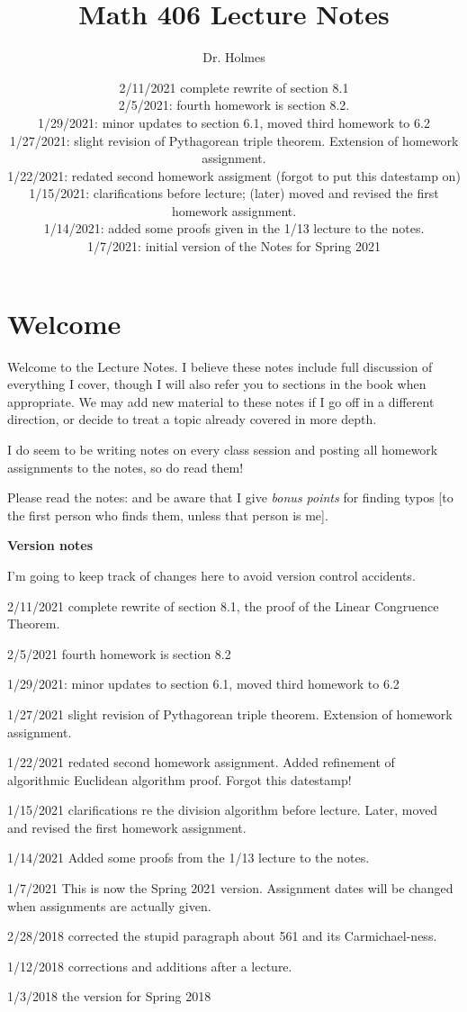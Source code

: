 \documentclass[12pt]{article}
\title{Math 406 Lecture Notes}
\author{Dr. Holmes}
\date{
2/11/2021 complete rewrite of section 8.1\\2/5/2021:  fourth homework is section 8.2.\\
1/29/2021:  minor updates to section 6.1, moved third homework to 6.2\\
1/27/2021:  slight revision of Pythagorean triple theorem.  Extension of homework assignment.\\
1/22/2021:  redated second homework assigment (forgot to put this datestamp on)\\
1/15/2021:  clarifications before lecture;  (later) moved and revised the first homework assignment.\\
1/14/2021:  added some proofs given in the 1/13 lecture to the notes.\\
1/7/2021:  initial version of the Notes for Spring 2021}
\begin{document}
\maketitle

\section{Welcome}

Welcome to the Lecture Notes.  I believe these notes include full discussion of everything I cover, though I will also refer you to sections in the book when appropriate.  We may add new material to these notes if I go off in a different direction, or decide to treat a topic already covered in more depth.

I do seem to be writing notes on every class session and posting all homework assignments to the notes, so do read them!

Please read the notes:  and be aware that I give {\em bonus points} for finding typos [to the first person who finds them, unless that person is me].

{\bf Version notes}

I'm going to keep track of changes here to avoid version control accidents.

2/11/2021 complete rewrite of section 8.1, the proof of the Linear Congruence Theorem.

2/5/2021 fourth homework is section 8.2

1/29/2021:  minor updates to section 6.1, moved third homework to 6.2

1/27/2021   slight revision of Pythagorean triple theorem.  Extension of homework assignment.

1/22/2021  redated second homework assignment.  Added refinement of algorithmic Euclidean algorithm proof.  Forgot this datestamp!

1/15/2021 clarifications re the division algorithm before lecture.  Later, moved and revised the first homework assignment.

1/14/2021  Added some proofs from the 1/13 lecture to the notes.

1/7/2021 This is now the Spring 2021 version.  Assignment dates will be changed when assignments are actually given.

2/28/2018 corrected the stupid paragraph about 561 and its Carmichael-ness.

1/12/2018 corrections and additions after a lecture.

1/3/2018 the version for Spring 2018
\end{document}
